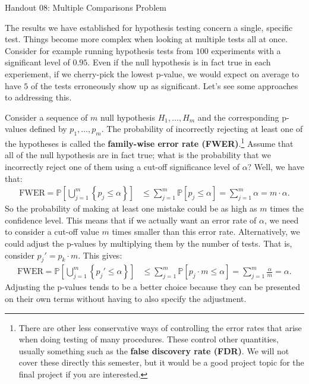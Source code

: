 \documentclass{tufte-handout}
\newcommand{\Prob}{\mathbb{P}}
\begin{document}
\justify

{\LARGE Handout 08: Multiple Comparisons Problem}

\vspace*{18pt}

\noindent
The results we have established for hypothesis testing concern a
single, specific test. Things become more complex when looking at
multiple tests all at once. Consider for example running hypothesis
tests from $100$ experiments with a significant level of $0.95$. Even
if the null hypothesis is in fact true in each experiement, if we
cherry-pick the lowest p-value, we would expect on average to have
$5$ of the tests erroneously show up as significant. Let's see some
approaches to addressing this.

Consider a sequence of $m$ null hypothesis $H_1, \ldots, H_m$ and the
corresponding p-values defined by $p_1, \ldots, p_m$. The probability
of incorrectly rejecting at least one of the hypotheses is called the
\textbf{family-wise error rate (FWER)}.\footnote{
  There are other less conservative ways of controlling the error rates that
  arise when doing testing of many procedures. These control other quantities,
  usually something such as the \textbf{false discovery rate (FDR)}. We will
  not cover these directly this semester, but it would be a good project topic
  for the final project if you are interested.
}
Assume that all of the null
hypothesis are in fact true; what is the probability that we incorrectly
reject one of them using a cut-off significance level of $\alpha$? Well,
we have that:
\begin{align*}
\text{FWER} = \Prob \left[ \bigcup_{j=1}^m \left\{ p_j \leq \alpha \right\} \right]
&\leq \sum_{j=1}^m \Prob \left[ p_j \leq \alpha \right] = \sum_{j=1}^m \alpha = m \cdot \alpha.
\end{align*} 
So the probability of making at least one mistake could be as high as
$m$ times the confidence level. This means that if we actually want an
error rate of $\alpha$, we need to consider a cut-off value $m$ times
smaller than this error rate. Alternatively, we could adjust the p-values
by multiplying them by the number of tests. That is, consider $p_j' = p_k \cdot m$.
This gives:
\begin{align*}
\text{FWER} = \Prob \left[ \bigcup_{j=1}^m \left\{ p_j' \leq \alpha \right\} \right]
&\leq \sum_{j=1}^m \Prob \left[ p_j \cdot m \leq \alpha \right] =
\sum_{j=1}^m \frac{\alpha}{m} = \alpha.
\end{align*} 
Adjusting the p-values tends to be a better choice because they can be
presented on their own terms without having to also specify the adjustment.
\end{document}
